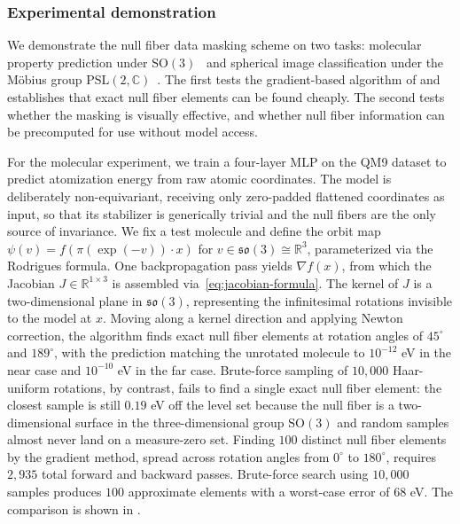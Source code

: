 \documentclass[11pt]{article}
\newcommand{\CC}{\mathbb{C}}
\newcommand{\RR}{\mathbb{R}}
\begin{document}
\subsubsection{Experimental demonstration}\label{sec:encryption-experiments}

We demonstrate the null fiber data masking scheme on two tasks: molecular property prediction under $\mathrm{SO}(3)$~\cite{ramakrishnan2014quantum,ruddigkeit2012enumeration} and spherical image classification under the Möbius group $\mathrm{PSL}(2, \CC)$~\cite{cohen2018spherical}. The first tests the gradient-based algorithm of  and establishes that exact null fiber elements can be found cheaply. The second tests whether the masking is visually effective, and whether null fiber information can be precomputed for use without model access.

For the molecular experiment, we train a four-layer MLP on the QM9 dataset to predict atomization energy from raw atomic coordinates. The model is deliberately non-equivariant, receiving only zero-padded flattened coordinates as input, so that its stabilizer is generically trivial and the null fibers are the only source of invariance. We fix a test molecule and define the orbit map $\psi(v) = f(\pi(\exp(-v)) \cdot x)$ for $v \in \mathfrak{so}(3) \cong \RR^3$, parameterized via the Rodrigues formula. One backpropagation pass yields $\nabla f(x)$, from which the Jacobian $J \in \RR^{1 \times 3}$ is assembled via~\eqref{eq:jacobian-formula}. The kernel of $J$ is a two-dimensional plane in $\mathfrak{so}(3)$, representing the infinitesimal rotations invisible to the model at $x$. Moving along a kernel direction and applying Newton correction, the algorithm finds exact null fiber elements at rotation angles of $45^\circ$ and $189^\circ$, with the prediction matching the unrotated molecule to $10^{-12}$ eV in the near case and $10^{-10}$ eV in the far case. Brute-force sampling of $10{,}000$ Haar-uniform rotations, by contrast, fails to find a single exact null fiber element: the closest sample is still $0.19$ eV off the level set because the null fiber is a two-dimensional surface in the three-dimensional group $\mathrm{SO}(3)$ and random samples almost never land on a measure-zero set. Finding $100$ distinct null fiber elements by the gradient method, spread across rotation angles from $0^\circ$ to $180^\circ$, requires $2{,}935$ total forward and backward passes. Brute-force search using $10{,}000$ samples produces $100$ approximate elements with a worst-case error of $68$ eV. The comparison is shown in .
\end{document}
